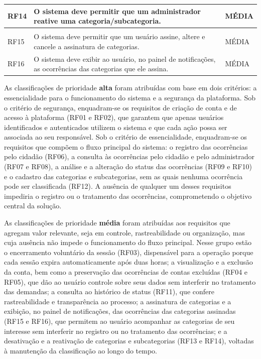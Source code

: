 \documentclass[12pt,a4paper]{article}
\begin{document}
\begin{longtable}{|p{}|p{}|p{}|}
\hline
RF14 & O sistema deve permitir que um administrador reative uma categoria/subcategoria. & MÉDIA \\
\hline
\rowcolor{gray!20}
\multicolumn{3}{|c|}{\textbf{Assinaturas e Notificações}} \\
\hline
RF15 & O sistema deve permitir que um usuário assine, altere e cancele a assinatura de categorias. & MÉDIA \\
\hline
RF16 & O sistema deve exibir ao usuário, no painel de notificações, as ocorrências das categorias que ele assina. & MÉDIA \\
\end{longtable}

As classificações de prioridade \textbf{alta} foram atribuídas com base em dois critérios: a essencialidade para o funcionamento do sistema e a segurança da plataforma. Sob o critério de segurança, enquadram-se os requisitos de criação de conta e de acesso à plataforma (RF01 e RF02), que garantem que apenas usuários identificados e autenticados utilizem o sistema e que cada ação possa ser associada ao seu responsável. Sob o critério de essencialidade, enquadram-se os requisitos que compõem o fluxo principal do sistema: o registro das ocorrências pelo cidadão (RF06), a consulta às ocorrências pelo cidadão e pelo administrador (RF07 e RF08), a análise e a alteração do status das ocorrências (RF09 e RF10) e o cadastro das categorias e subcategorias, sem as quais nenhuma ocorrência pode ser classificada (RF12). A ausência de qualquer um desses requisitos impediria o registro ou o tratamento das ocorrências, comprometendo o objetivo central da solução.

As classificações de prioridade \textbf{média} foram atribuídas aos requisitos que agregam valor relevante, seja em controle, rastreabilidade ou organização, mas cuja ausência não impede o funcionamento do fluxo principal. Nesse grupo estão o encerramento voluntário da sessão (RF03), dispensável para a operação porque cada sessão expira automaticamente após duas horas; a visualização e a exclusão da conta, bem como a preservação das ocorrências de contas excluídas (RF04 e RF05), que dão ao usuário controle sobre seus dados sem interferir no tratamento das demandas; a consulta ao histórico de status (RF11), que confere rastreabilidade e transparência ao processo; a assinatura de categorias e a exibição, no painel de notificações, das ocorrências das categorias assinadas (RF15 e RF16), que permitem ao usuário acompanhar as categorias de seu interesse sem interferir no registro ou no tratamento das ocorrências; e a desativação e a reativação de categorias e subcategorias (RF13 e RF14), voltadas à manutenção da classificação ao longo do tempo.
\end{document}
